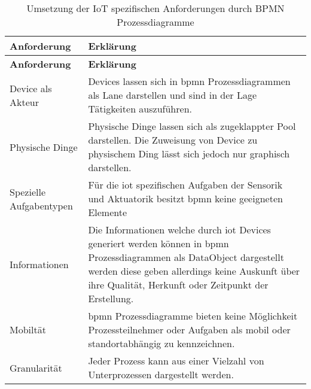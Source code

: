  \begin{longtable}{P{4cm}|X}
  \caption{Umsetzung der IoT spezifischen Anforderungen durch BPMN Prozessdiagramme}\\
  \label{table:evaluierungskriterien}
  \textbf{Anforderung} & \textbf{Erklärung}   \\ \hline
  \endfirsthead %
  \textbf{Anforderung} & \textbf{Erklärung}  \\ \hline
  \endhead %
  Device als Akteur & Devices lassen sich in \ac{bpmn} Prozessdiagrammen als Lane darstellen und sind in der Lage Tätigkeiten auszuführen.\\ \hline
  Physische Dinge  & Physische Dinge lassen sich als zugeklappter Pool darstellen. Die Zuweisung von Device zu physischem Ding lässt sich jedoch nur graphisch darstellen.\\ \hline
  Spezielle Aufgabentypen & Für die \ac{iot} spezifischen Aufgaben der Sensorik und Aktuatorik besitzt \ac{bpmn} keine geeigneten Elemente\\ \hline
  Informationen  & Die Informationen welche durch \ac{iot} Devices generiert werden können in \ac{bpmn} Prozessdiagrammen als DataObject dargestellt werden diese geben allerdings keine Auskunft über ihre Qualität, Herkunft oder Zeitpunkt der Erstellung. \\ \hline
  Mobiltät & \ac{bpmn} Prozessdiagramme bieten keine Möglichkeit Prozessteilnehmer oder Aufgaben als mobil oder standortabhängig zu kennzeichnen.\\ \hline
  Granularität & Jeder Prozess kann aus einer Vielzahl von Unterprozessen dargestellt werden.\\
 \end{longtable}
